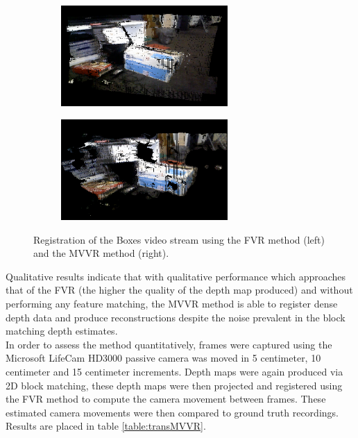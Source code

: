 \begin{figure}[!htb]
        \centering
        \begin{subfigure}[b]{2.8in}
                \includegraphics[width=2.5in]{images/results/mvvr/boxesFVR}
                \label{fig:boxFVRRes}
        \end{subfigure}%
        \begin{subfigure}[b]{2.8in}
                \includegraphics[width=2.5in]{images/results/mvvr/boxesMVVR}
                \label{fig:boxMVVRRes}
        \end{subfigure}
        \caption{Registration of the Boxes video stream using the FVR method (left) and the MVVR method (right).}
       \label{fig:boxesMVVRQResults}
\end{figure}

Qualitative results indicate that with qualitative performance which approaches that of the FVR (the higher the quality of the depth map produced) and without performing any feature matching, the MVVR method is able to register dense depth data and produce reconstructions despite the noise prevalent in the block matching depth estimates. \\

In order to assess the method quantitatively, frames were captured using the Microsoft LifeCam HD3000 passive camera was moved in 5 centimeter, 10 centimeter and 15 centimeter increments. Depth maps were again produced via 2D block matching, these depth maps were then projected and registered using the FVR method to compute the camera movement between frames. These estimated camera movements were then compared to ground truth recordings. Results are placed in table \ref{table:transMVVR}.

